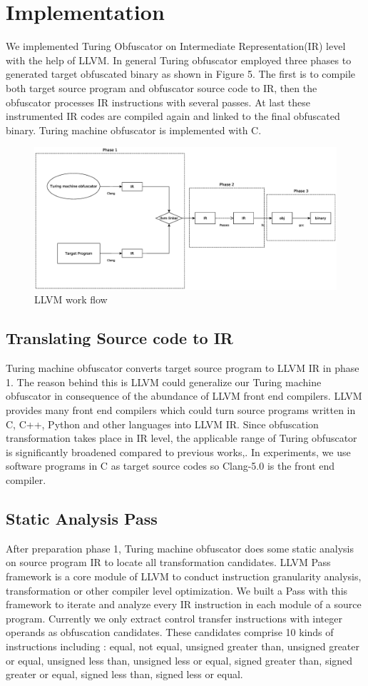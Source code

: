\documentclass[lnicst]{svmultln}
\begin{document}
\section{Implementation}
We implemented Turing Obfuscator on Intermediate Representation(IR) level with the help of LLVM\cite{LLVM}. In general Turing obfuscator employed three phases to generated target obfuscated binary as shown in Figure 5. The first is to compile both target source program and obfuscator source code to IR, then the obfuscator processes IR instructions with several passes. At last these instrumented IR codes are compiled again and linked to the final obfuscated binary. Turing machine obfuscator is implemented with C. 
\begin{figure}
 \includegraphics[width=\linewidth]{llvm-flow.eps}
 \caption{LLVM work flow}
 \label{Figure 5}
\end{figure}
\subsection{Translating Source code to IR}
Turing machine obfuscator converts target source program to LLVM IR in phase 1. The reason behind this is LLVM could generalize our Turing machine obfuscator in consequence of the abundance of LLVM front end compilers. LLVM provides many front end compilers which could turn source programs written in C, C++, Python and other languages into LLVM IR. Since obfuscation transformation takes place in IR level, the applicable range of Turing obfuscator is significantly broadened compared to previous works\cite{Ma},\cite{Zhi}. In experiments, we use software programs in C as target source codes so Clang-5.0 is the front end compiler.
\subsection{Static Analysis Pass}
After preparation phase 1, Turing machine obfuscator does some static analysis on source program IR to locate all transformation candidates. LLVM Pass framework is a core module of LLVM to conduct instruction granularity analysis, transformation or other compiler level optimization.
We built a Pass with this framework to iterate and analyze every IR instruction in each module of a source program. Currently we only extract control transfer instructions with integer operands as obfuscation candidates. These candidates comprise 10 kinds of instructions including : equal, not equal, unsigned greater than, unsigned greater or equal,  unsigned less than, unsigned less or equal, signed greater than, signed greater or equal, signed less than, signed less or equal. 
\end{document}
